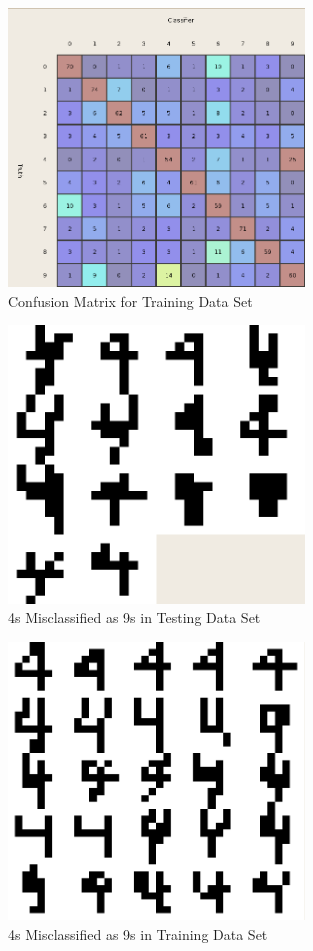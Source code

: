 \documentclass{article}
\begin{document}
\begin{figure}
\centering
\includegraphics[width=0.7\textwidth]{ConfusionMatrixTraining.png}
\caption{Confusion Matrix for Training Data Set}
\label{trainconfusion}
\end{figure}

\begin{figure}
\centering
\includegraphics[width=0.7\textwidth]{4-9-testing.png}
\caption{4s Misclassified as 9s in Testing Data Set}
\label{4_9_missclass_training}
\end{figure}

\begin{figure}
\centering
\includegraphics[width=0.7\textwidth]{4-9-training.png}
\caption{4s Misclassified as 9s in Training Data Set}
\label{4_9_missclass_training}
\end{figure}
\end{document}
